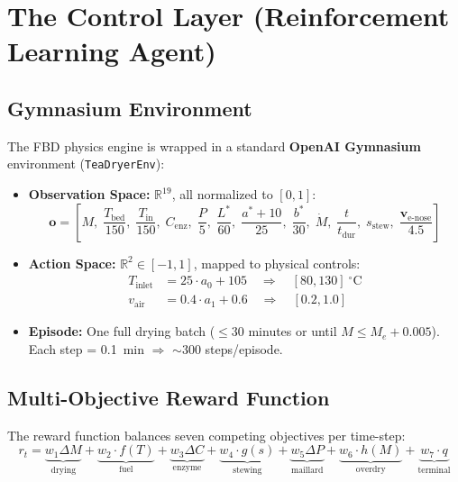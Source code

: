 ﻿\documentclass[12pt, a4paper]{report}
\begin{document}
\section{The Control Layer (Reinforcement Learning Agent)}

\subsection{Gymnasium Environment}
The FBD physics engine is wrapped in a standard \textbf{OpenAI Gymnasium} environment (\texttt{TeaDryerEnv}):

\begin{itemize}
    \item \textbf{Observation Space:} $\mathbb{R}^{19}$, all normalized to $[0, 1]$:
    \begin{equation}
    \mathbf{o} = \left[M,\; \frac{T_\text{bed}}{150},\; \frac{T_\text{in}}{150},\; C_\text{enz},\; \frac{P}{5},\; \frac{L^*}{60},\; \frac{a^*+10}{25},\; \frac{b^*}{30},\; \dot{M},\; \frac{t}{t_\text{dur}},\; s_\text{stew},\; \frac{\mathbf{v}_\text{e-nose}}{4.5}\right]
    \end{equation}

    \item \textbf{Action Space:} $\mathbb{R}^2 \in [-1, 1]$, mapped to physical controls:
    \begin{align}
    T_{\text{inlet}} &= 25 \cdot a_0 + 105 \quad \Rightarrow \quad [80, 130]~^\circ\text{C} \\
    v_{\text{air}} &= 0.4 \cdot a_1 + 0.6 \quad \Rightarrow \quad [0.2, 1.0]
    \end{align}

    \item \textbf{Episode:} One full drying batch ($\leq 30$ minutes or until $M \leq M_e + 0.005$). Each step = 0.1~min $\Rightarrow$ $\sim$300 steps/episode.
\end{itemize}

\subsection{Multi-Objective Reward Function}
The reward function balances seven competing objectives per time-step:
\begin{equation}
r_t = \underbrace{w_1 \Delta M}_{\text{drying}} + \underbrace{w_2 \cdot f(T)}_{\text{fuel}} + \underbrace{w_3 \Delta C}_{\text{enzyme}} + \underbrace{w_4 \cdot g(s)}_{\text{stewing}} + \underbrace{w_5 \Delta P}_{\text{maillard}} + \underbrace{w_6 \cdot h(M)}_{\text{overdry}} + \underbrace{w_7 \cdot q}_{\text{terminal}}
\end{equation}
\end{document}
